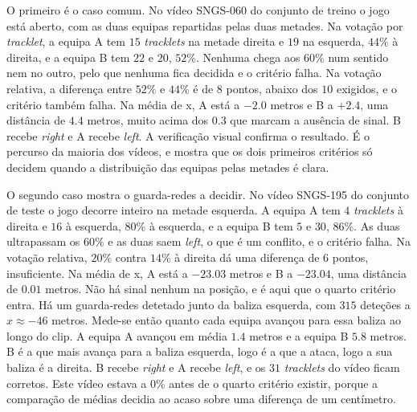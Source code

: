 O primeiro é o caso comum. No vídeo SNGS-060 do conjunto de treino o jogo está aberto, com as duas
equipas repartidas pelas duas metades. Na votação por \emph{tracklet}, a equipa A tem $15$
\emph{tracklets} na metade direita e $19$ na esquerda, $44\%$ à direita, e a equipa B tem $22$ e
$20$, $52\%$. Nenhuma chega aos $60\%$ num sentido nem no outro, pelo que nenhuma fica decidida e o
critério falha. Na votação relativa, a diferença entre $52\%$ e $44\%$ é de $8$ pontos, abaixo dos
$10$ exigidos, e o critério também falha. Na média de x, A está a $-2.0$ metros e B a $+2.4$, uma
distância de $4.4$ metros, muito acima dos $0.3$ que marcam a ausência de sinal. B recebe
\emph{right} e A recebe \emph{left}. A verificação visual confirma o resultado. É o percurso da
maioria dos vídeos, e mostra que os dois primeiros critérios só decidem quando a distribuição das
equipas pelas metades é clara.

O segundo caso mostra o guarda-redes a decidir. No vídeo SNGS-195 do conjunto de teste o jogo
decorre inteiro na metade esquerda. A equipa A tem $4$ \emph{tracklets} à direita e $16$ à
esquerda, $80\%$ à esquerda, e a equipa B tem $5$ e $30$, $86\%$. As duas ultrapassam os $60\%$ e
as duas saem \emph{left}, o que é um conflito, e o critério falha. Na votação relativa, $20\%$
contra $14\%$ à direita dá uma diferença de $6$ pontos, insuficiente. Na média de x, A está a
$-23.03$ metros e B a $-23.04$, uma distância de $0.01$ metros. Não há sinal nenhum na posição, e
é aqui que o quarto critério entra. Há um guarda-redes detetado junto da baliza esquerda, com $315$
deteções a $x \approx -46$ metros. Mede-se então quanto cada equipa avançou para essa baliza ao
longo do clip. A equipa A avançou em média $1.4$ metros e a equipa B $5.8$ metros. B é a que
mais avança para a baliza esquerda, logo é a que a ataca, logo a sua baliza é a direita. B recebe
\emph{right} e A recebe \emph{left}, e os $31$ \emph{tracklets} do vídeo ficam corretos. Este
vídeo estava a $0\%$ antes de o quarto critério existir, porque a comparação de médias decidia ao
acaso sobre uma diferença de um centímetro.


